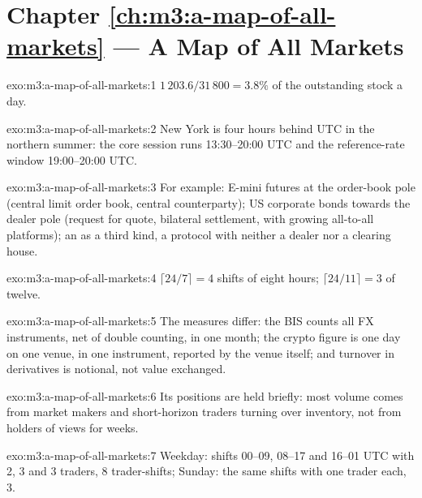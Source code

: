 \section*{Chapter \ref{ch:m3:a-map-of-all-markets} --- A Map of All Markets}

\begin{solution}{exo:m3:a-map-of-all-markets:1}
$1\,203.6/31\,800 = 3.8\%$ of the outstanding stock a day.
\end{solution}

\begin{solution}{exo:m3:a-map-of-all-markets:2}
New York is four hours behind UTC in the northern summer: the core session runs 13:30--20:00 UTC and the reference-rate window 19:00--20:00 UTC.
\end{solution}

\begin{solution}{exo:m3:a-map-of-all-markets:3}
For example: E-mini futures at the order-book pole (central limit order book, central counterparty); US corporate bonds towards the dealer pole
(request for quote, bilateral settlement, with growing all-to-all platforms); an  as a third kind, a protocol with neither a
dealer nor a clearing house.
\end{solution}

\begin{solution}{exo:m3:a-map-of-all-markets:4}
$\lceil 24/7 \rceil = 4$ shifts of eight hours; $\lceil 24/11 \rceil = 3$ of twelve.
\end{solution}

\begin{solution}{exo:m3:a-map-of-all-markets:5}
The measures differ: the BIS counts all FX instruments, net of double counting, in one month; the crypto figure is one day on one venue, in one
instrument, reported by the venue itself; and turnover in derivatives is notional, not value exchanged.
\end{solution}

\begin{solution}{exo:m3:a-map-of-all-markets:6}
Its positions are held briefly: most volume comes from market makers and short-horizon traders turning over inventory, not from holders of views
for weeks.
\end{solution}

\begin{solution}{exo:m3:a-map-of-all-markets:7}
Weekday: shifts 00--09, 08--17 and 16--01 UTC with 2, 3 and 3 traders, 8 trader-shifts; Sunday: the same shifts with one trader each, 3.
\end{solution}

